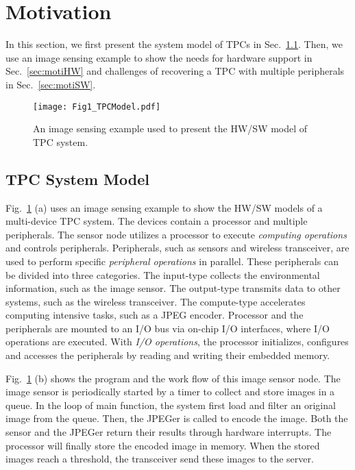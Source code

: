 \section{Motivation} \label{sec:motivation}
%
In this section, we first present the system model of TPCs in Sec.~\ref{sec:motiModel}. 
Then, we use an image sensing example to show the needs for hardware support in Sec.~\ref{sec:motiHW} and challenges of recovering a TPC with multiple peripherals in Sec.~\ref{sec:motiSW}. 

%
\begin{figure}[t]
    \centering
    \texttt{[image: Fig1\_TPCModel.pdf]}
    \vspace{-10pt}
    \caption{An image sensing example used to present the HW/SW model of TPC system.}
    \vspace{-5pt}
    \label{fig:TPCmodel}
\end{figure}

\subsection{TPC System Model} \label{sec:motiModel}
\vspace{-5pt}
%
Fig.~\ref{fig:TPCmodel} (a) uses an image sensing example to show the HW/SW models of a multi-device TPC system.
The devices contain a processor and multiple peripherals.
The sensor node utilizes a processor to execute \emph{computing operations} and controls peripherals.
Peripherals, such as sensors and wireless transceiver, are used to perform specific \emph{peripheral operations} in parallel. 
These peripherals can be divided into three categories.
The input-type collects the environmental information, such as the image sensor.
The output-type transmits data to other systems, such as the wireless transceiver.
The compute-type accelerates computing intensive tasks, such as a JPEG encoder.
Processor and the peripherals are mounted to an I/O bus via on-chip I/O interfaces, where I/O operations are executed.
With \emph{I/O operations}, the processor initializes, configures and accesses the peripherals by reading and writing their embedded memory. 

Fig.~\ref{fig:TPCmodel} (b) shows the program and the work flow of this image sensor node.
The image sensor is periodically started by a timer to collect and store images in a queue.
In the loop of main function, the system first load and filter an original image from the queue.
Then, the JPEGer is called to encode the image.
Both the sensor and the JPEGer return their results through hardware interrupts.
The processor will finally store the encoded image in memory.
When the stored images reach a threshold, the transceiver send these images to the server.

